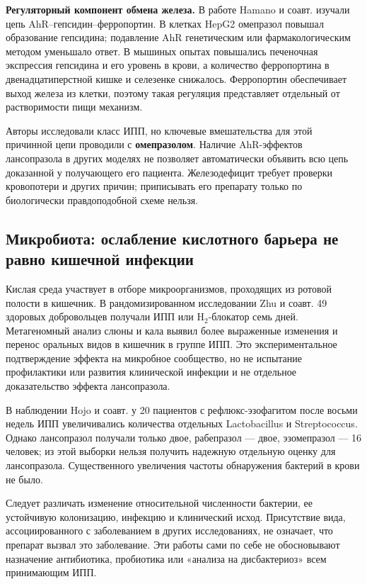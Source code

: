 \documentclass[11pt,a4paper,notitlepage]{report}
\newcommand{\src}[1]{\unskip\space\cite{#1}}
\begin{document}
\textbf{Регуляторный компонент обмена железа.} В работе Hamano и соавт. изучали цепь AhR--гепсидин--ферропортин. В клетках HepG2 омепразол повышал образование гепсидина; подавление AhR генетическим или фармакологическим методом уменьшало ответ. В мышиных опытах повышались печеночная экспрессия гепсидина и его уровень в крови, а количество ферропортина в двенадцатиперстной кишке и селезенке снижалось. Ферропортин обеспечивает выход железа из клетки, поэтому такая регуляция представляет отдельный от растворимости пищи механизм.\src{safeiron}

Авторы исследовали класс ИПП, но ключевые вмешательства для этой причинной цепи проводили с \textbf{омепразолом}. Наличие AhR-эффектов лансопразола в других моделях не позволяет автоматически объявить всю цепь доказанной у получающего его пациента. Железодефицит требует проверки кровопотери и других причин; приписывать его препарату только по биологически правдоподобной схеме нельзя.\src{safeiron,molahr}

\subsection{Микробиота: ослабление кислотного барьера не равно кишечной инфекции}
Кислая среда участвует в отборе микроорганизмов, проходящих из ротовой полости в кишечник. В рандомизированном исследовании Zhu и соавт. 49 здоровых добровольцев получали ИПП или H$_2$-блокатор семь дней. Метагеномный анализ слюны и кала выявил более выраженные изменения и перенос оральных видов в кишечник в группе ИПП. Это экспериментальное подтверждение эффекта на микробное сообщество, но не испытание профилактики или развития клинической инфекции и не отдельное доказательство эффекта лансопразола.\src{safemicrotrial}

В наблюдении Hojo и соавт. у 20 пациентов с рефлюкс-эзофагитом после восьми недель ИПП увеличивались количества отдельных Lactobacillus и Streptococcus. Однако лансопразол получали только двое, рабепразол --- двое, эзомепразол --- 16 человек; из этой выборки нельзя получить надежную отдельную оценку для лансопразола. Существенного увеличения частоты обнаружения бактерий в крови не было.\src{safemicrocohort}

Следует различать изменение относительной численности бактерии, ее устойчивую колонизацию, инфекцию и клинический исход. Присутствие вида, ассоциированного с заболеванием в других исследованиях, не означает, что препарат вызвал это заболевание. Эти работы сами по себе не обосновывают назначение антибиотика, пробиотика или «анализа на дисбактериоз» всем принимающим ИПП.\src{safemicrotrial,safemicrocohort}
\end{document}

